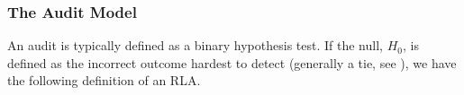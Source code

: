 


\subsubsection{The Audit Model}
\label{sec:intro-model}
An audit is typically defined as a binary hypothesis test. If the null, $H_0$, is defined as the incorrect outcome hardest to detect (generally a tie, see \cite{Bayesian-RLA}), we have the following definition of an RLA. 

